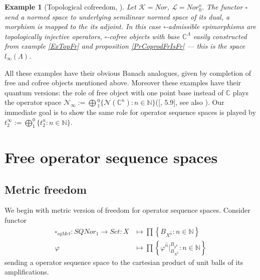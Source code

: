 \documentclass[12pt]{article}
\newtheorem{example}[theorem]{Example}
\begin{document}
\begin{example}[Topological cofreedom, \cite{ShtTopFr}]\label{ExTopCoFr}
Let $\mathcal{K} = Nor$, $\mathcal{L} = Nor_0^o$. The functor $\square$ send a normed space to underlying semilinear normed space of its dual, a morphism is mapped to the its adjoint. In this case $\square$-admissible epimorphisms are topologically injective operators, $\square$-cofree objects with base $\mathbb{C}^\Lambda$ easily constructed from example \ref{ExTopFr} and proposition \ref{PrCoprodFrIsFr} --- this is the space $l_\infty(\Lambda)$. 
\end{example}

All these examples have their obvious Banach analogues, given by completion of free and cofree objects mentioned above. Moreover these examples have their quantum versions: the role of free object with one point base instead of $\mathbb{C}$ plays the operator space $\mathcal{N}_{\infty} :=  \bigoplus{}_1^0\{\mathcal{N}(\mathbb{C}^n):n\in\mathbb{N}\}$([\cite{HelMetrFrQmod}, 5.9], 
see also \cite{ShtTopFr}). Our immediate goal is to show the same role for operator sequence spaces is played by $t_2^{\infty} :=  \bigoplus_1^0\{t_2^n:n\in\mathbb{N}\}$.  






































\section{Free operator sequence spaces}

\subsection{Metric freedom}

We begin with metric version of freedom for operator sequence spaces. Consider functor
$$
\begin{aligned}
\square_{sqMet} : SQNor_1 \to Set : X&\mapsto\prod\left\{ B_{X^{\wideparen{n}}}:n \in \mathbb{N}\right\}\\
\varphi&\mapsto \prod\left\{\varphi^{\wideparen{n}}|_{B_{X^{\wideparen{n}}}}^{B_{Y^{\wideparen{n}}}}:n\in\mathbb{N}\right\}
\end{aligned}
$$
sending a operator sequence space to the cartesian product of unit balls of its amplifications. 
\end{document}
